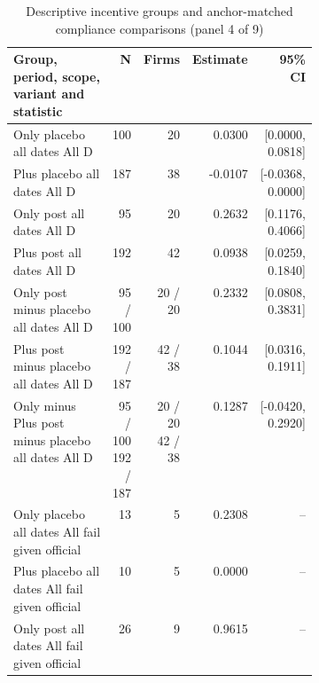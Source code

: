 \begin{table}[!htbp]\centering\scriptsize
\caption{Descriptive incentive groups and anchor-matched compliance comparisons (panel 4 of 9)}
\begin{threeparttable}
\begin{tabular}{p{0.40\linewidth}rrrr}
\toprule
Group, period, scope, variant and statistic & N & Firms & Estimate & 95\% CI \\
\midrule
Only placebo all dates All D & 100 & 20 & 0.0300 & [0.0000, 0.0818] \\
Plus placebo all dates All D & 187 & 38 & -0.0107 & [-0.0368, 0.0000] \\
Only post all dates All D & 95 & 20 & 0.2632 & [0.1176, 0.4066] \\
Plus post all dates All D & 192 & 42 & 0.0938 & [0.0259, 0.1840] \\
Only post minus placebo all dates All D & 95 / 100 & 20 / 20 & 0.2332 & [0.0808, 0.3831] \\
Plus post minus placebo all dates All D & 192 / 187 & 42 / 38 & 0.1044 & [0.0316, 0.1911] \\
Only minus Plus post minus placebo all dates All D & \shortstack{95 / 100\\192 / 187} & \shortstack{20 / 20\\42 / 38} & 0.1287 & [-0.0420, 0.2920] \\
Only placebo all dates All fail given official & 13 & 5 & 0.2308 & -- \\
Plus placebo all dates All fail given official & 10 & 5 & 0.0000 & -- \\
Only post all dates All fail given official & 26 & 9 & 0.9615 & -- \\
\bottomrule
\end{tabular}
\begin{tablenotes}[flushleft]\footnotesize

\end{tablenotes}
\end{threeparttable}
\end{table}

